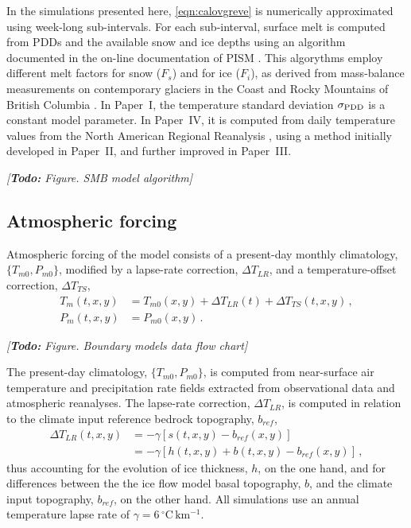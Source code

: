 \documentclass{article}
\newcommand{\todo}[1]{\emph{[\textbf{Todo:} #1]}}
\newcommand{\unit}[1]{\ensuremath{\mathrm{#1}}}
\newcommand{\degree}[0]{\ensuremath{^{\circ}}}
\newcommand{\degC}[0]{\unit{{\degree}C}}
\newcommand{\CCLI}[0]{Paper~I}      %
\newcommand{\PSDV}[0]{Paper~II}     %
\newcommand{\PSDP}[0]{Paper~III}    %
\newcommand{\CCYC}[0]{Paper~IV}     %
\begin{document}
In the simulations presented here, \cref{eqn:calovgreve} is numerically
approximated using week-long sub-intervals. For each sub-interval, surface melt
is computed from PDDs and the available snow and ice depths using an algorithm
documented in the on-line documentation of PISM \citep{PISM-authors.2014}. This
algorythms employ different melt factors for snow ($F_s$) and for ice ($F_i$),
as derived from mass-balance measurements on contemporary glaciers in the
Coast and Rocky Mountains of British Columbia \citep{Shea.etal.2009}. In
{\CCLI}, the temperature standard deviation $\sigma_{\mathrm{PDD}}$ is a constant model
parameter. In {\CCYC}, it is computed from daily temperature values from the
North American Regional Reanalysis \citep[NARR,][]{Mesinger.etal.2006}, using
a method initially developed in {\PSDV}, and further improved in {\PSDP}.

\todo{Figure. SMB model algorithm}

\subsection{Atmospheric forcing}

Atmospheric forcing of the model consists of a present-day monthly climatology,
$\{T_{m0}, P_{m0}\}$, modified by a lapse-rate correction, ${\Delta}T_{LR}$,
and a temperature-offset correction, ${\Delta}T_{TS}$,
\begin{subequations}
\begin{align}
    T_m(t, x, y) &= T_{m0}(x, y) + {\Delta}T_{LR}(t)
                                 + {\Delta}T_{TS}(t, x, y) \,, \\
    P_m(t, x, y) &= P_{m0}(x, y) \,.
\end{align}
\end{subequations}

\todo{Figure. Boundary models data flow chart}

The present-day climatology, $\{T_{m0}, P_{m0}\}$, is computed from
near-surface air temperature and precipitation rate fields extracted from
observational data and atmospheric reanalyses.
The lapse-rate correction, ${\Delta}T_{LR}$, is computed in relation to the
climate input reference bedrock topography, $b_{ref}$,
\begin{align}
    {\Delta}T_{LR}(t, x, y) &= -\gamma [s(t, x, y)-b_{ref}(x, y)] \\
                            &= -\gamma [h(t, x, y)+b(t, x, y)-b_{ref}(x, y)]\,,
\end{align}
thus accounting for the evolution of ice thickness, $h$, on the one hand, and
for differences between the the ice flow model basal topography, $b$, and the
climate input topography, $b_{ref}$, on the other hand. All simulations use an
annual temperature lapse rate of $\gamma = 6\,\unit{\degC\,km^{-1}}$.
\end{document}

